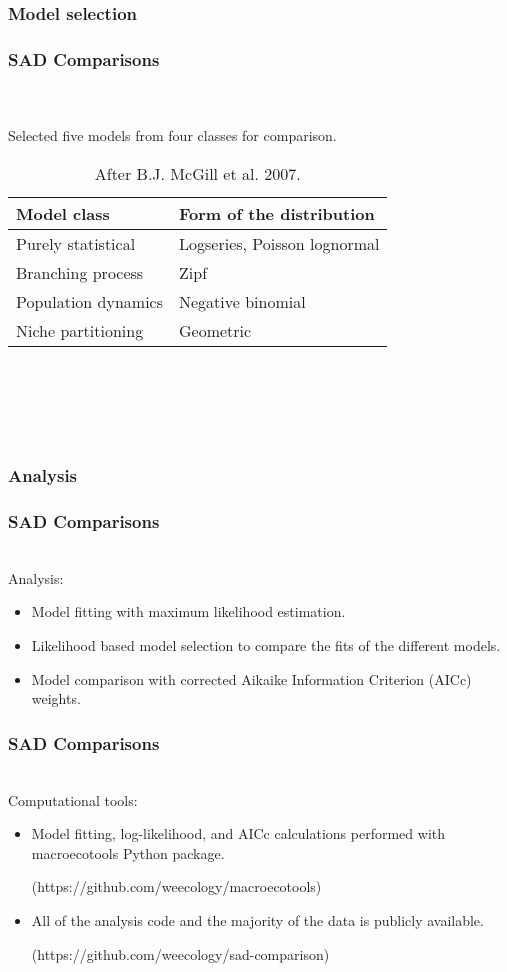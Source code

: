 \documentclass[14pt]{beamer}
\begin{document}
\subsubsection{Model selection}
\begin{frame}[shrink=10]
\frametitle{SAD Comparisons}
~\\
~\\
Selected five models from four classes for comparison.
\begin{table}
\begin{tabular}{l|l}
 Model class & Form of the distribution\\ 
\hline
 Purely statistical & Logseries, Poisson lognormal\\
 Branching process & Zipf \\
 Population dynamics & Negative binomial\\
 Niche partitioning & Geometric \\
\end{tabular}
~\\
~\\
~\\
~\\
\caption{After B.J. McGill et al. 2007.}
\end{table}
\end{frame}

\subsubsection{Analysis}
\begin{frame}
\frametitle{SAD Comparisons}
~\\
Analysis:
\begin{itemize}
\item Model fitting with maximum likelihood estimation. 
\item Likelihood based model selection to compare the fits of the different models.
\item Model comparison with corrected Aikaike Information Criterion (AICc) weights.
\end{itemize}
\end{frame}

\begin{frame}
\frametitle{SAD Comparisons}
~\\
Computational tools:
\begin{itemize}
\item Model fitting, log-likelihood, and AICc calculations performed with macroecotools Python package.\\
\begin{small}
(https://github.com/weecology/macroecotools)
\end{small}
\item All of the analysis code and the majority of the data is publicly available.
\begin{small}
(https://github.com/weecology/sad-comparison)
\end{small}
\end{itemize}
\end{frame}
\end{document}
